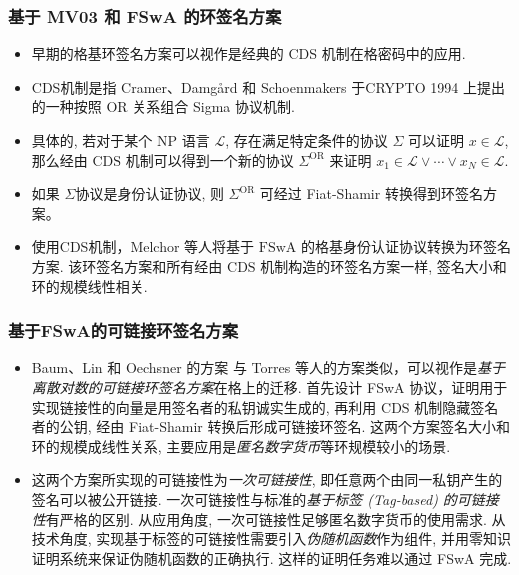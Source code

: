 \documentclass{beamer}
\begin{document}
        \begin{frame}
            \frametitle{基于 MV03 和 FSwA 的环签名方案}
        
            \begin{itemize}
                \item 早期的格基环签名方案可以视作是经典的 CDS 机制在格密码中的应用. 
                \item CDS机制是指 Cramer、Damgård 和 Schoenmakers  于CRYPTO 1994 上提出的一种按照 OR 关系组合 Sigma 协议机制. 
                \item 具体的, 若对于某个 $\mathrm{NP}$ 语言 $\mathcal{L}$, 存在满足特定条件的协议 $\Sigma$ 可以证明 $x \in \mathcal{L}$, 那么经由 $\mathrm{CDS}$ 机制可以得到一个新的协议 $\Sigma^{\mathrm{OR}}$ 来证明 $x_{1} \in \mathcal{L} \vee \cdots \vee x_{N} \in \mathcal{L} .$ 
                \item 如果 $\Sigma$协议是身份认证协议, 则 $\Sigma^{\mathrm{OR}}$ 可经过 Fiat-Shamir 转换得到环签名方案。
                \item 使用CDS机制，Melchor 等人将基于 $\mathrm{FSwA}$ 的格基身份认证协议转换为环签名方案. 该环签名方案和所有经由 $\mathrm{CDS}$ 机制构造的环签名方案一样, 签名大小和环的规模线性相关. 

            \end{itemize}
        
        \end{frame}

        \begin{frame}
            \frametitle{基于FSwA的可链接环签名方案}
            \begin{itemize}
                \item Baum、Lin 和 Oechsner 的方案 与 Torres 等人的方案类似，可以视作是\emph{基于离散对数的可链接环签名方案}在格上的迁移. 首先设计 FSwA 协议，证明用于实现链接性的向量是用签名者的私钥诚实生成的, 再利用 $\mathrm{CDS}$ 机制隐藏签名者的公钥, 经由 Fiat-Shamir 转换后形成可链接环签名. 这两个方案签名大小和环的规模成线性关系, 主要应用是\emph{匿名数字货币}等环规模较小的场景. 
                \item 这两个方案所实现的可链接性为\emph{一次可链接性}, 即任意两个由同一私钥产生的签名可以被公开链接.  一次可链接性与标准的\emph{基于标签 (Tag-based) 的可链接性}有严格的区别. 从应用角度, 一次可链接性足够匿名数字货币的使用需求. 从技术角度, 实现基于标签的可链接性需要引入\emph{伪随机函数}作为组件, 并用零知识证明系统来保证伪随机函数的正确执行. 这样的证明任务难以通过 FSwA 完成.
            \end{itemize}
            
        
        \end{frame}
\end{document}
